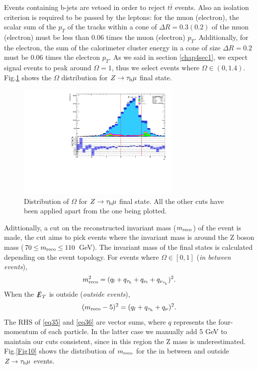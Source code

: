 Events containing b-jets are vetoed in order to reject $t\bar{t}$ events. Also an isolation criterion is required to be passed by the leptons: for the muon (electron), the scalar sum of the $p_T$ of the tracks within a cone of $\Delta R=0.3 (0.2)$ of the muon (electron) must be less than 0.06 times the muon (electron) $p_T$. Additionally, for the electron, the sum of the calorimeter cluster energy in a cone of size $\Delta R=0.2$ must be 0.06 times the electron $p_T$. As we said in section \ref{chap4sec1}, we expect signal events to peak around $\Omega=1$, thus we select events where $\Omega\in (0,1.4)$. Fig.\ref{Fig9} shows the $\Omega$ distribution for $Z\to\tau_\text{h}\mu$ final state.
\begin{figure}[h]
	\centering
	\includegraphics[width=0.7\textwidth]{figures/Fig9}
	\caption{Distribution of $\Omega$ for $Z\to\tau_\text{h}\mu$ final state. All the other cuts have been applied apart from the one being plotted.}
	\label{Fig9}
\end{figure}
Adittionally, a cut on the reconstructed invariant mass ($m_{\text{reco}}$) of the event is made, the cut aims to pick events where the invariant mass is around the Z boson mass ($70\leq m_{\text{reco}}\leq 110$ GeV). The invariant mass of the final states is calculated depending on the event topology. For events where $\Omega\in [0,1]$ (\textit{in between events}),
\begin{equation}
	m_{\text{reco}}^{2}=(q_l+q_{\tau_\text{h}}+q_{\nu_l}+q_{\nu_{\tau_\text{h}}})^2.
	\label{eq35}
\end{equation}
When the $\slashed{E}_T$ is outside (\textit{outside events}),
\begin{equation}
	(m_{\text{reco}}-5)^{2}=(q_l+q_{\tau_\text{h}}+q_\nu)^2.
	\label{eq36}
\end{equation}
The RHS of \eqref{eq35} and \eqref{eq36} are vector sums, where $q$ represents the four-momentum of each particle. In the latter case we manually add 5 GeV to maintain our cuts consistent, since in this region the Z mass is underestimated. Fig.\ref{Fig10} shows the distribution of $m_{\text{reco}}$ for the in between and outside $Z\to\tau_\text{h}\mu$ events. 
